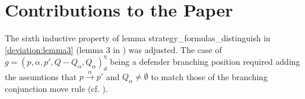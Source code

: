 \section{Contributions to the Paper}
The sixth inductive property of lemma strategy\_formulas\_distinguish in \ref{deviation:lemma3} (lemma 3 in \cite{bisping2023lineartimebranchingtime}) was adjusted. The case of $g=(p,\alpha ,p', Q- Q_\alpha, Q_\alpha)_d^\eta$ being a defender branching position required adding the assumtions that $p \overset{\alpha}{\longrightarrow} p'$ and $Q_\alpha \neq \emptyset$ to match those of the branching conjunction move rule (cf. \cite[p. 13]{bisping2023lineartimebranchingtime}). 
